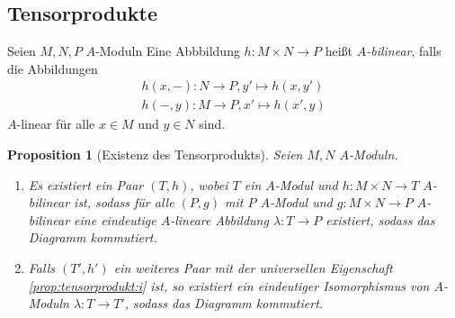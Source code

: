 \documentclass[12pt,a4paper]{scrartcl}
\theoremstyle{cplain}
\newtheorem{prop}[thmcounter]{Proposition}
\theoremstyle{cdef}
\begin{document}
\subsection{Tensorprodukte}
\begin{defi}
	Seien $M,N,P$ $A$-Moduln Eine Abbbildung $h: M \times N \to P$ heißt \emph{$A$-bilinear}, falls die Abbildungen
	\begin{gather*}
		h(x,-): N \to P, y' \mapsto h(x,y') \\
		h(-,y): M \to P, x' \mapsto h(x',y)
	\end{gather*}
	$A$-linear für alle $x \in M$ und $y \in N$ sind.
\end{defi}
\begin{prop}[Existenz des Tensorprodukts] \label{prop:tensorprodukt}
	Seien $M,N$ $A$-Moduln.
	\begin{enumerate}
		\item Es existiert ein Paar $(T,h)$, wobei $T$ ein $A$-Modul und $h: M \times N \to T$ $A$-bilinear ist, sodass für alle $(P,g)$ mit $P$ $A$-Modul und $g: M \times N \to P$ $A$-bilinear eine eindeutige $A$-lineare Abbildung $\lambda:T \to P$ existiert, sodass das Diagramm  kommutiert. \label{prop:tensorprodukt:i}
		\item Falls $(T',h')$ ein weiteres Paar mit der universellen Eigenschaft \ref{prop:tensorprodukt:i} ist, so existiert ein eindeutiger Isomorphismus von $A$-Moduln $\lambda: T \to T'$, sodass das Diagramm  kommutiert. \label{prop:tensorprodukt:ii}
	\end{enumerate}
	\begin{figure}[H]
		\begin{subfigure}[b]{.5\linewidth}
			\centering
			\caption{}
			\label{prop:tensorprodukt:a}
		\end{subfigure}
		\begin{subfigure}[b]{.5\linewidth}
			\centering
			\caption{}
			\label{prop:tensorprodukt:b}
		\end{subfigure}
	\end{figure}
\end{prop}
\end{document}
